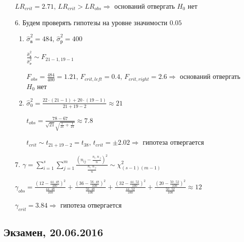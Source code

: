 \begin{enumerate}
$LR_{crit} = 2.71$, $LR_{crit} > LR_{obs} \Rightarrow$ оснований отвергать $H_0$ нет

\item[6.]  Будем проверять гипотезы на уровне значимости $0.05$
\begin{enumerate}
\item $\hat{\sigma}^2_{\text{в}} = 484$, $\hat{\sigma}^2_{\text{р}} = 400$

$\frac{\hat{\sigma}^2_{\text{в}} }{\hat{\sigma}^2_{\text{р}}} \sim F_{21-1 , 19-1}$

$F_{obs} = \frac{484}{400} = 1.21$, $F_{crit, left} = 0.4$, $F_{crit, right} = 2.6  \Rightarrow$ оснований отвергать $H_0$ нет

\item $\hat{\sigma}_0^2 = \frac{22\cdot (21-1) + 20 \cdot (19-1)}{21 + 19 - 2} \approx 21$

$t_{obs} = \frac{78-67}{\sqrt{21} \sqrt{\frac{1}{21}+ \frac{1}{21}}} \approx 7.8 $

$t_{crit}  \sim t_{21+19-2} = t_{38}$, $t_{crit} = \pm 2.02 \Rightarrow$ гипотеза отвергается
\end{enumerate}
\item[7.] $\gamma = \sum_{i=1}^s \sum_{j=1}^m \frac{\left(n_{ij} - \frac{n_{i\cdot}n_{\cdot j}}{n}\right)^2}{\frac{n_{i\cdot}n_{\cdot j}}{n}} \sim \chi^2_{(s-1)(m-1)}$

$\gamma_{obs} = \frac{\left(12-\frac{44\cdot48}{100}\right)^2}{\frac{44\cdot48}{100}} + \frac{\left(36-\frac{56\cdot48}{100}\right)^2}{\frac{56\cdot48}{100}} + \frac{\left(32-\frac{44\cdot52}{100}\right)^2}{\frac{44\cdot52}{100}} + \frac{\left(20-\frac{50\cdot52}{100}\right)^2}{\frac{50\cdot52}{100}} \approx 12$

$\gamma_{crit} = 3.84 \Rightarrow$  гипотеза отвергается

\end{enumerate}


\subsection{Экзамен, 20.06.2016}



